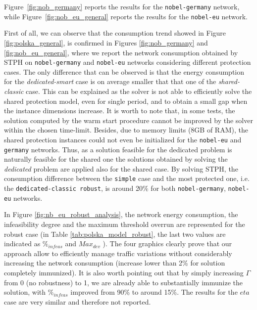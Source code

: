 \documentclass[final,5p,times,twocolumn]{elsarticle}
\begin{document}
Figure~\ref{fig:nob_germany} reports the results for the {\tt nobel-germany} network, while Figure~\ref{fig:nob_eu_general} reports the results for the {\tt nobel-eu} network.

First of all, we can observe that the consumption trend showed in Figure \ref{fig:polska_general}, is confirmed in Figures \ref{fig:nob_germany} and \ref{fig:nob_eu_general}, where we report the network consumption obtained by STPH on {\tt nobel-germany} and {\tt nobel-eu} networks considering different protection cases. The only difference that can be observed is that the energy consumption for the \textit{dedicated-smart} case is on average smaller that that one of the \textit{shared-classic} case. This can be explained as the solver is not able to efficiently solve the shared protection model, even for single period, and to obtain a small gap  when the instance dimensions increase. It is worth to note that, in some tests, the solution computed by the warm start procedure cannot be improved by the solver within the chosen time-limit. Besides, due to memory limits (8GB of RAM), the shared protection instances could not even be initialized for the  {\tt nobel-eu} and {\tt germany} networks. Thus,  as a solution feasible for the dedicated problem is naturally feasible for the shared one the solutions obtained by solving the \textit{dedicated} problem are applied also for the shared case. By solving STPH, the consumption difference between the {\tt simple} case and  the most protected one, i.e. the {\tt dedicated-classic robust}, is around 20\% for both {\tt nobel-germany}, {\tt nobel-eu} networks.

In Figure \ref{fig:nb_eu_robust_analysis},  the network energy consumption, the infeasibility degree and the maximum threshold overrun  are represented  for the robust case (in Table \ref{tab:polska_model_robust}, the last two values are indicated as $\%_{infeas}$ and $Max_{dev}$ ). The four graphics clearly prove that our approach allow to efficiently manage traffic variations without considerably increasing the network consumption (increase lower than 2\% for solution completely immunized). It is also worth pointing out that by simply increasing $\Gamma$ from 0 (no robustness) to 1, we are already able to substantially immunize the solution, with $\%_{infeas}$ improved from 90\% to around 15\%. The results for the $eta$ case are very similar and therefore not reported.
\end{document}
